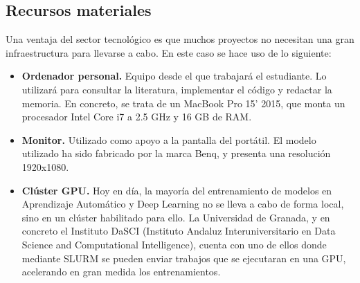 \subsection{Recursos materiales}

Una ventaja del sector tecnológico es que muchos proyectos no necesitan una gran infraestructura para llevarse a cabo. En este caso se hace uso de lo siguiente:
\begin{itemize}
    \item \textbf{Ordenador personal.} Equipo desde el que trabajará el estudiante. Lo utilizará para consultar la literatura, implementar el código y redactar la memoria. En concreto, se trata de un MacBook Pro 15' 2015, que monta un procesador Intel Core i7 a 2.5 GHz y 16 GB de RAM.
    \item \textbf{Monitor.} Utilizado como apoyo a la pantalla del portátil. El modelo utilizado ha sido fabricado por la marca Benq, y presenta una resolución 1920x1080.
    \item \textbf{Clúster GPU.} Hoy en día, la mayoría del entrenamiento de modelos en Aprendizaje Automático y Deep Learning no se lleva a cabo de forma local, sino en un clúster habilitado para ello. La Universidad de Granada, y en concreto el Instituto DaSCI (Instituto Andaluz Interuniversitario en Data Science and Computational Intelligence), cuenta con uno de ellos donde mediante SLURM se pueden enviar trabajos que se ejecutaran en una GPU, acelerando en gran medida los entrenamientos.
\end{itemize}

